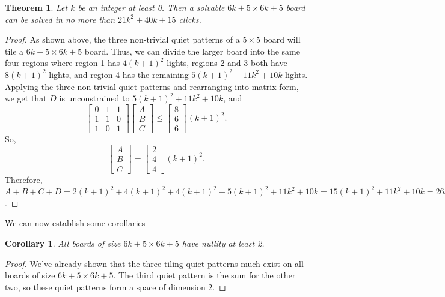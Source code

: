 \documentclass{article}
\newtheorem{theorem}{Theorem}
\newtheorem{corollary}{Corollary}
\begin{document}
	\begin{theorem}
		Let $k$ be an integer at least 0.
		Then a solvable $6k + 5 \times 6k + 5$ board can be solved in no more than $21k^2 + 40k + 15$ clicks.
	\end{theorem}
	\begin{proof}
		As shown above, the three non-trivial quiet patterns of a $5 \times 5$ board will tile a $6k + 5 \times 6k + 5$ board.
		Thus, we can divide the larger board into the same four regions where region 1 has $4(k+1)^2$ lights, regions 2 and 3 both have $8(k+1)^2$ lights, and region 4 has the remaining $5(k+1)^2 + 11k^2 + 10k$ lights.
		Applying the three non-trivial quiet patterns and rearranging into matrix form, we get that $D$ is unconstrained to $5(k+1)^2 + 11k^2 + 10k$, and
		\begin{equation}
			\begin{bmatrix}
				0 & 1 & 1 \\
				1 & 1 & 0 \\
				1 & 0 & 1 
			\end{bmatrix}
			\begin{bmatrix}
				A \\
				B \\
				C
			\end{bmatrix}
			\leq
			\begin{bmatrix}
				8 \\
				6 \\
				6
			\end{bmatrix}(k+1)^2.
		\end{equation}
		So,
		\begin{equation*}
			\begin{bmatrix}
				A \\
				B \\
				C
			\end{bmatrix}
			=
			\begin{bmatrix}
				2 \\
				4 \\
				4
			\end{bmatrix}(k+1)^2.
		\end{equation*}
		Therefore, $A + B + C + D = 2(k+1)^2 + 4(k+1)^2 +  4(k+1)^2 + 5(k+1)^2 + 11k^2 + 10k = 15(k+1)^2 + 11k^2 + 10k = 26k^2 + 40k + 15$.
	\end{proof}

	We can now establish some corollaries
	\begin{corollary}
		All boards of size $6k + 5 \times 6k + 5$ have nullity at least 2.
	\end{corollary}
	\begin{proof}
		We've already shown that the three tiling quiet patterns much exist on all boards of size $6k + 5 \times 6k + 5$.
		The third quiet pattern is the sum for the other two, so these quiet patterns form a space of dimension 2.
	\end{proof}
\end{document}
